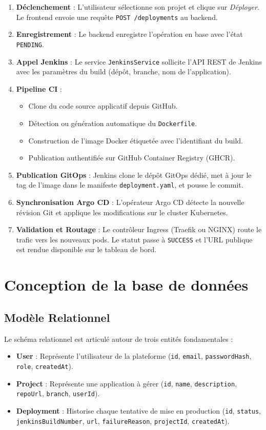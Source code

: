 \documentclass[12pt,a4paper,oneside]{report}
\begin{document}
\begin{enumerate}
    \item \textbf{Déclenchement} : L'utilisateur sélectionne son projet et clique sur \textit{Déployer}. Le frontend envoie une requête \texttt{POST /deployments} au backend.
    \item \textbf{Enregistrement} : Le backend enregistre l'opération en base avec l'état \texttt{PENDING}.
    \item \textbf{Appel Jenkins} : Le service \texttt{JenkinsService} sollicite l'API REST de Jenkins avec les paramètres du build (dépôt, branche, nom de l'application).
    \item \textbf{Pipeline CI} :
    \begin{itemize}
        \item Clone du code source applicatif depuis GitHub.
        \item Détection ou génération automatique du \texttt{Dockerfile}.
        \item Construction de l'image Docker étiquetée avec l'identifiant du build.
        \item Publication authentifiée sur GitHub Container Registry (GHCR).
    \end{itemize}
    \item \textbf{Publication GitOps} : Jenkins clone le dépôt GitOps dédié, met à jour le tag de l'image dans le manifeste \texttt{deployment.yaml}, et pousse le commit.
    \item \textbf{Synchronisation Argo CD} : L'opérateur Argo CD détecte la nouvelle révision Git et applique les modifications sur le cluster Kubernetes.
    \item \textbf{Validation et Routage} : Le contrôleur Ingress (Traefik ou NGINX) route le trafic vers les nouveaux pods. Le statut passe à \texttt{SUCCESS} et l'URL publique est rendue disponible sur le tableau de bord.
\end{enumerate}

\section{Conception de la base de données}
\subsection{Modèle Relationnel}
Le schéma relationnel est articulé autour de trois entités fondamentales :
\begin{itemize}[label=$\bullet$]
    \item \textbf{User} : Représente l'utilisateur de la plateforme (\texttt{id}, \texttt{email}, \texttt{passwordHash}, \texttt{role}, \texttt{createdAt}).
    \item \textbf{Project} : Représente une application à gérer (\texttt{id}, \texttt{name}, \texttt{description}, \texttt{repoUrl}, \texttt{branch}, \texttt{userId}).
    \item \textbf{Deployment} : Historise chaque tentative de mise en production (\texttt{id}, \texttt{status}, \texttt{jenkinsBuildNumber}, \texttt{url}, \texttt{failureReason}, \texttt{projectId}, \texttt{createdAt}).
\end{itemize}
\end{document}
